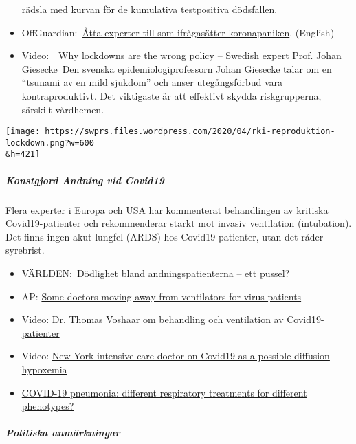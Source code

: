 \begin{itemize}
  rädsla med kurvan för de kumulativa testpositiva dödsfallen.
\item
  OffGuardian:~\href{https://off-guardian.org/2020/04/17/8-more-experts-questioning-the-coronavirus-panic/}{Åtta
  experter till som ifrågasätter koronapaniken}. (English)
\item
  Video:~~\href{https://www.youtube.com/watch?v=bfN2JWifLCY}{Why
  lockdowns are the wrong policy -- Swedish expert Prof. Johan
  Giesecke}~Den svenska epidemiologiprofessorn Johan Giesecke talar om
  en ``tsunami av en mild sjukdom'' och anser utegångsförbud vara
  kontraproduktivt. Det viktigaste är att effektivt skydda
  riskgrupperna, särskilt vårdhemen.
\end{itemize}

\texttt{[image: https://swprs.files.wordpress.com/2020/04/rki-reproduktion-lockdown.png?w=600\\\&h=421]}

\hypertarget{konstgjord-andning-vid-covid19}{%
\subparagraph{\texorpdfstring{\textbf{Konstgjord Andning vid
Covid19}}{Konstgjord Andning vid Covid19}}\label{konstgjord-andning-vid-covid19}}

Flera experter i Europa och USA har kommenterat behandlingen av kritiska
Covid19-patienter och rekommenderar starkt mot invasiv ventilation
(intubation). Det finns ingen akut lungfel (ARDS) hos Covid19-patienter,
utan det råder syrebrist.

\begin{itemize}
\tightlist
\item
  VÄRLDEN:~\href{https://www.welt.de/vermischtes/article207221877/Corona-Pandemie-Sterberate-bei-Beatmungspatienten-gibt-Raetsel-auf.html}{Dödlighet
  bland andningspatienterna -- ett pussel?}
\item
  AP: \href{https://apnews.com/8ccd325c2be9bf454c2128dcb7bd616d}{Some
  doctors moving away from ventilators for virus patients}
\item
  Video: \href{https://www.youtube.com/watch?v=QPlEUAVjxV8}{Dr. Thomas
  Voshaar om behandling och ventilation av Covid19-patienter}
\item
  Video: \href{https://www.youtube.com/watch?v=NmRlvX3VrAQ}{New York
  intensive care doctor on Covid19 as a possible diffusion hypoxemia}
\item
  \href{https://link.springer.com/article/10.1007/s00134-020-06033-2}{COVID-19
  pneumonia: different respiratory treatments for different phenotypes?}
\end{itemize}

\hypertarget{politiska-anmuxe4rkningar}{%
\subparagraph{\texorpdfstring{\textbf{Politiska
anmärkningar}}{Politiska anmärkningar}}\label{politiska-anmuxe4rkningar}}

